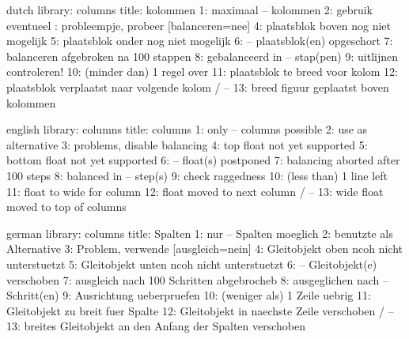 

\unprotect


%
 

\startmessages  dutch  library: columns
  title: kolommen
      1: maximaal -- kolommen
      2: gebruik eventueel \string{}: probleempje, probeer [balanceren=nee]
      4: plaatsblok boven nog niet mogelijk
      5: plaatsblok onder nog niet mogelijk
      6: -- plaatsblok(en) opgeschort
      7: balanceren afgebroken na 100 stappen
      8: gebalanceerd in -- stap(pen)
      9: uitlijnen controleren!
     10: (minder dan) 1 regel over
     11: plaatsblok te breed voor kolom
     12: plaatsblok verplaatst naar volgende kolom / --
     13: breed figuur geplaatst boven kolommen
\stopmessages

\startmessages  english  library: columns
  title: columns
      1: only -- columns possible
      2: use \string\filbreak\space as alternative
      3: problems, disable balancing
      4: top float not yet supported
      5: bottom float not yet supported
      6: -- float(s) postponed
      7: balancing aborted after 100 steps
      8: balanced in -- step(s)
      9: check raggedness
     10: (less than) 1 line left
     11: float to wide for column
     12: float moved to next column / --
     13: wide float moved to top of columns
\stopmessages

\startmessages  german  library: columns
  title: Spalten
      1: nur -- Spalten moeglich
      2: benutzte \string\filbreak\space als Alternative
      3: Problem, verwende [ausgleich=nein]
      4: Gleitobjekt oben ncoh nicht unterstuetzt
      5: Gleitobjekt unten ncoh nicht unterstuetzt
      6: -- Gleitobjekt(e) verschoben
      7: ausgleich nach 100 Schritten abgebrocheb
      8: ausgeglichen nach  -- Schritt(en)
      9: Ausrichtung ueberpruefen
     10: (weniger als) 1 Zeile uebrig
     11: Gleitobjekt zu breit fuer Spalte
     12: Gleitobjekt in naechste Zeile verschoben / --
     13: breites Gleitobjekt an den Anfang der Spalten verschoben
\stopmessages

